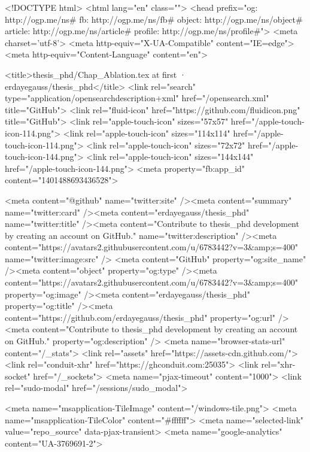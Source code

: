 


<!DOCTYPE html>
<html lang="en" class="">
  <head prefix="og: http://ogp.me/ns# fb: http://ogp.me/ns/fb# object: http://ogp.me/ns/object# article: http://ogp.me/ns/article# profile: http://ogp.me/ns/profile#">
    <meta charset='utf-8'>
    <meta http-equiv="X-UA-Compatible" content="IE=edge">
    <meta http-equiv="Content-Language" content="en">
    
    
    <title>thesis_phd/Chap_Ablation.tex at first · erdayegauss/thesis_phd</title>
    <link rel="search" type="application/opensearchdescription+xml" href="/opensearch.xml" title="GitHub">
    <link rel="fluid-icon" href="https://github.com/fluidicon.png" title="GitHub">
    <link rel="apple-touch-icon" sizes="57x57" href="/apple-touch-icon-114.png">
    <link rel="apple-touch-icon" sizes="114x114" href="/apple-touch-icon-114.png">
    <link rel="apple-touch-icon" sizes="72x72" href="/apple-touch-icon-144.png">
    <link rel="apple-touch-icon" sizes="144x144" href="/apple-touch-icon-144.png">
    <meta property="fb:app_id" content="1401488693436528">

      <meta content="@github" name="twitter:site" /><meta content="summary" name="twitter:card" /><meta content="erdayegauss/thesis_phd" name="twitter:title" /><meta content="Contribute to thesis_phd development by creating an account on GitHub." name="twitter:description" /><meta content="https://avatars2.githubusercontent.com/u/6783442?v=3&amp;s=400" name="twitter:image:src" />
      <meta content="GitHub" property="og:site_name" /><meta content="object" property="og:type" /><meta content="https://avatars2.githubusercontent.com/u/6783442?v=3&amp;s=400" property="og:image" /><meta content="erdayegauss/thesis_phd" property="og:title" /><meta content="https://github.com/erdayegauss/thesis_phd" property="og:url" /><meta content="Contribute to thesis_phd development by creating an account on GitHub." property="og:description" />
      <meta name="browser-stats-url" content="/_stats">
    <link rel="assets" href="https://assets-cdn.github.com/">
    <link rel="conduit-xhr" href="https://ghconduit.com:25035">
    <link rel="xhr-socket" href="/_sockets">
    <meta name="pjax-timeout" content="1000">
    <link rel="sudo-modal" href="/sessions/sudo_modal">

    <meta name="msapplication-TileImage" content="/windows-tile.png">
    <meta name="msapplication-TileColor" content="#ffffff">
    <meta name="selected-link" value="repo_source" data-pjax-transient>
      <meta name="google-analytics" content="UA-3769691-2">

